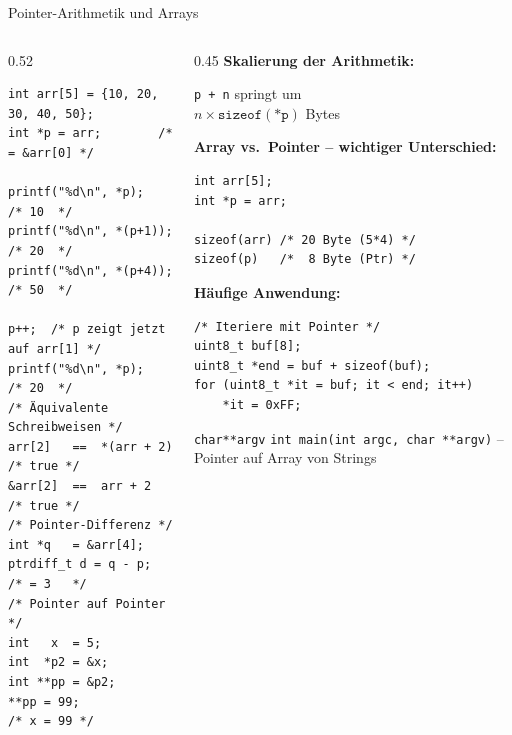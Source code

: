 \documentclass[%
  aspectratio=169,
  10pt
]{beamer}
\begin{document}
\begin{frame}[fragile]{Pointer-Arithmetik und Arrays}
  \begin{columns}[T]
    \begin{column}{0.52\textwidth}
\begin{lstlisting}
int arr[5] = {10, 20, 30, 40, 50};
int *p = arr;        /* = &arr[0] */

printf("%d\n", *p);      /* 10  */
printf("%d\n", *(p+1));  /* 20  */
printf("%d\n", *(p+4));  /* 50  */

p++;  /* p zeigt jetzt auf arr[1] */
printf("%d\n", *p);      /* 20  */
/* Äquivalente Schreibweisen */
arr[2]   ==  *(arr + 2)  /* true */
&arr[2]  ==  arr + 2     /* true */
/* Pointer-Differenz */
int *q   = &arr[4];
ptrdiff_t d = q - p;   /* = 3   */
/* Pointer auf Pointer */
int   x  = 5;
int  *p2 = &x;
int **pp = &p2;
**pp = 99;             /* x = 99 */
\end{lstlisting}
    \end{column}
    \begin{column}{0.45\textwidth}
      \textbf{Skalierung der Arithmetik:}
      \begin{block}{}
        \texttt{p + n} springt um \\
        $n \times \mathtt{sizeof(*p)}$ Bytes
      \end{block}

      \vspace{0.4em}
      \textbf{Array vs.\ Pointer -- wichtiger Unterschied:}
\begin{lstlisting}
int arr[5];
int *p = arr;

sizeof(arr) /* 20 Byte (5*4) */
sizeof(p)   /*  8 Byte (Ptr) */
\end{lstlisting}

      \vspace{0.2em}
      \textbf{Häufige Anwendung:}
\begin{lstlisting}
/* Iteriere mit Pointer */
uint8_t buf[8];
uint8_t *end = buf + sizeof(buf);
for (uint8_t *it = buf; it < end; it++)
    *it = 0xFF;
\end{lstlisting}
      \begin{block}{\texttt{char**argv}}
        \texttt{int main(int argc, char **argv)} --
        Pointer auf Array von Strings
      \end{block}
    \end{column}
  \end{columns}
\end{frame}
\end{document}
